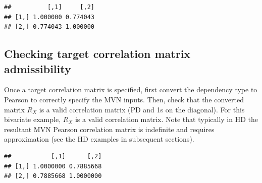 \documentclass{article}
\newenvironment{Shaded}{\begin{snugshade}}{\end{snugshade}}
\newcommand{\CommentTok}[1]{\textcolor[rgb]{0.56,0.35,0.01}{\textit{#1}}}
\newcommand{\FunctionTok}[1]{\textcolor[rgb]{0.00,0.00,0.00}{#1}}
\newcommand{\NormalTok}[1]{#1}
\newcommand{\OtherTok}[1]{\textcolor[rgb]{0.56,0.35,0.01}{#1}}
\newcommand{\SpecialCharTok}[1]{\textcolor[rgb]{0.00,0.00,0.00}{#1}}
\begin{document}
\begin{Shaded}
\end{Shaded}

\begin{verbatim}
##          [,1]     [,2]
## [1,] 1.000000 0.774043
## [2,] 0.774043 1.000000
\end{verbatim}

\hypertarget{checking-target-correlation-matrix-admissibility}{%
\subsection{Checking target correlation matrix
admissibility}\label{checking-target-correlation-matrix-admissibility}}

Once a target correlation matrix is specified, first convert the
dependency type to Pearson to correctly specify the MVN inputs. Then,
check that the converted matrix \(R_X\) is a valid correlation matrix
(PD and 1s on the diagonal). For this bivariate example, \(R_X\) is a
valid correlation matrix. Note that typically in HD the resultant MVN
Pearson correlation matrix is indefinite and requires approximation (see
the HD examples in subsequent sections).

\begin{Shaded}
\end{Shaded}

\begin{verbatim}
##           [,1]      [,2]
## [1,] 1.0000000 0.7885668
## [2,] 0.7885668 1.0000000
\end{verbatim}

\begin{Shaded}
\end{Shaded}
\end{document}
